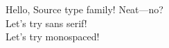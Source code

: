 \documentclass{article}
\begin{document}
Hello, Source type family! Neat---no? \\ \sffamily Let's try sans serif! \\ \ttfamily Let's try monospaced!
\end{document}
